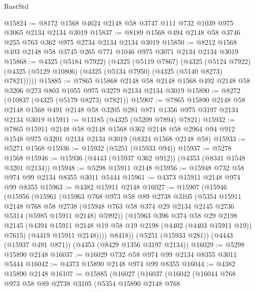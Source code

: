 \begin{lexlean}{RustStd}
\begin{coremodule}
@15824 := @8172 @1568 @4624 @2148 @58 @3747 @111 @732 @1039 @975 @3065 @2134 @2134 @3019
@15837 := @8189 @1568 @494 @2148 @58 @3746 @255 @763 @362 @975 @2734 @2134 @2134 @3019
@15850 := @8212 @1568 @493 @2148 @58 @3745 @265 @771 @1046 @975 @3071 @2134 @2134 @3019
@15868 := @4325
    (@5184 @7922)
    (@4325
      (@5119 @7867)
      (@4325
        (@5124 @7922)
        (@4325 (@5129 @10806) (@4325 (@5134 @7950) (@4325 (@5140 @8273) @7821)))))
@15885 := @7865
    @15868
    @2148
    @58
    @2148
    @1568
    @492
    @2148
    @58
    @3206
    @273
    @803
    @1055
    @975
    @3279
    @2134
    @2134
    @3019
@15890 := @8272 (@10837 (@4325 (@5179 @8273) @7821))
@15907 := @7865
    @15890
    @2148
    @58
    @2148
    @1568
    @491
    @2148
    @58
    @3205
    @281
    @871
    @1356
    @975
    @3197
    @2134
    @2134
    @3019
@15911 := @13185 (@4325 (@5209 @7894) @7821)
@15932 := @7865
    @15911
    @2148
    @58
    @2148
    @1568
    @362
    @2148
    @58
    @2964
    @94
    @912
    @1548
    @975
    @3201
    @2134
    @2134
    @3019
    (@8324 @1568 @2148 @58)
@15933 := @5271 @1568
@15936 := @15932 (@5251 (@15933 @94))
@15937 := @5278 @1568
@15946 := @15936 (@4443 (@15937 @362 @912)) (@4353 (@8341 @1548 @3201 @2134))
@15948 := @5298 @15911 @2148
@15956 := @15948 @732 @58 @974 @99 @2134 @8355 @3011 @5444
@15961 := @4373 @15911 @2148 @974 @99 @8355
@15963 := @4382 @15911 @2148
@16027 := @15907
    (@15946
      (@15956
        (@15961
          (@15963
            @768
            @973
            @58
            @89
            @2738
            @3105
            (@5354
              @15911
              @2148
              @768
              @58
              @2738
              (@15948 @763 @58 @374 @29 @2134 @2145 @2736 @5314 (@5985 @15911 @2148) @5992))
            (@15963
              @396
              @374
              @58
              @29
              @2198
              @2145
              (@4394 @15911 @2148 @19 @58 @19 @2198 (@4402 (@4403 @15911 @19)) @7615)
              (@4419 @15911 @2148))))
        @8418))
    (@5251 (@15933 @281))
    (@4443 (@15937 @491 @871))
    (@4353 (@8429 @1356 @3197 @2134))
@16029 := @5298 @15890 @2148
@16037 := @16029 @732 @58 @974 @99 @2134 @8355 @3011 @5444
@16042 := @4373 @15890 @2148 @974 @99 @8355
@16044 := @4382 @15890 @2148
@16107 := @15885
    (@16027
      (@16037
        (@16042
          (@16044
            @768
            @973
            @58
            @89
            @2738
            @3105
            (@5354
              @15890
              @2148
              @768

\end{coremodule}
\end{lexlean}
